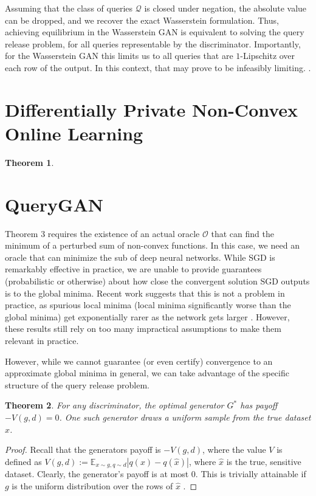 \documentclass[]{article}
\newcommand{\Q}{\mathcal{Q}}
\newtheorem{theorem}{Theorem}[section]
\theoremstyle{definition}
\begin{document}
Assuming that the class of queries $\Q$ is closed under negation, the absolute value can be dropped, and we recover the exact Wasserstein formulation. Thus, achieving equilibrium in the Wasserstein GAN is equivalent to solving the query release problem, for all queries representable by the discriminator. Importantly, for the Wasserstein GAN this limits us to all queries that are $1$-Lipschitz over each row of the output. In this context, that may prove to be infeasibly limiting. .



\section{Differentially Private Non-Convex Online Learning}

\begin{theorem}
    
\end{theorem}


\section{QueryGAN}

Theorem 3 requires the existence of an actual oracle $\mathcal{O}$ that can find the minimum of a perturbed sum of non-convex functions. In this case, we need an oracle that can minimize the sub of deep neural networks. While SGD is remarkably effective in practice, we are unable to provide guarantees (probabilistic or otherwise) about how close the convergent solution SGD outputs is to the global minima. Recent work suggests that this is not a problem in practice, as spurious local minima (local minima significantly worse than the global minima) get exponentially rarer as the network gets larger \cite{CHM+14}. However, these results still rely on too many impractical assumptions to make them relevant in practice. 

However, while we cannot guarantee (or even certify) convergence to an approximate global minima in general, we can take advantage of the specific structure of the query release problem. 

\begin{theorem}
    For any discriminator, the optimal generator $G^*$ has payoff $-V(g,d) = 0$. One such generator draws a uniform sample from the true dataset $\hat x$. 
\end{theorem}
\begin{proof}
    Recall that the generators payoff is  $-V(g,d)$, where the value $V$ is defined as $V(g,d) := \mathbb{E}_{x \sim g, q \sim d} |q(x) - q(\hat x)|$, where $\hat x$ is the true, sensitive dataset. Clearly, the generator's payoff is at most $0$. This is trivially attainable if $g$ is the uniform distribution over the rows of $\hat x$ .
\end{proof}
\end{document}
